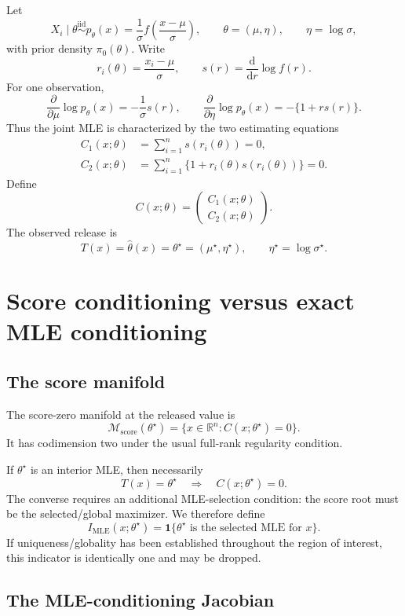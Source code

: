 \documentclass[11pt]{article}
\newcommand{\R}{\mathbb{R}}
\newcommand{\1}{\mathbf{1}}
\newcommand{\dd}{\mathrm{d}}
\newcommand{\MLE}{\mathrm{MLE}}
\begin{document}
Let
\[
    X_i\mid \theta \overset{\mathrm{iid}}{\sim}
    p_\theta(x)
    =\frac{1}{\sigma}
    f\!\left(\frac{x-\mu}{\sigma}\right),
    \qquad
    \theta=(\mu,\eta),\qquad \eta=\log\sigma,
\]
with prior density $\pi_0(\theta)$.  Write
\[
    r_i(\theta)=\frac{x_i-\mu}{\sigma},
    \qquad
    s(r)=\frac{\dd}{\dd r}\log f(r).
\]
For one observation,
\[
    \frac{\partial}{\partial \mu}\log p_\theta(x)
    =-\frac{1}{\sigma}s(r),
    \qquad
    \frac{\partial}{\partial \eta}\log p_\theta(x)
    =-\{1+r s(r)\}.
\]
Thus the joint MLE is characterized by the two estimating equations
\begin{align}
    C_1(x;\theta)
    &=\sum_{i=1}^n s(r_i(\theta))=0, \\
    C_2(x;\theta)
    &=\sum_{i=1}^n \{1+r_i(\theta)s(r_i(\theta))\}=0.
\end{align}
Define
\[
    C(x;\theta)
    =
    \begin{pmatrix}
    C_1(x;\theta)\\
    C_2(x;\theta)
    \end{pmatrix}.
\]
The observed release is
\[
    T(x)=\widehat\theta(x)=\theta^\star
    =(\mu^\star,\eta^\star),
    \qquad \eta^\star=\log\sigma^\star.
\]

\section{Score conditioning versus exact MLE conditioning}

\subsection{The score manifold}

The score-zero manifold at the released value is
\[
    \mathcal M_{\mathrm{score}}(\theta^\star)
    =\{x\in\R^n:C(x;\theta^\star)=0\}.
\]
It has codimension two under the usual full-rank regularity condition.

If $\theta^\star$ is an interior MLE, then necessarily
\[
    T(x)=\theta^\star
    \quad\Longrightarrow\quad
    C(x;\theta^\star)=0.
\]
The converse requires an additional MLE-selection condition: the score root must be the selected/global maximizer.  We therefore define
\[
    I_{\MLE}(x;\theta^\star)
    =\1\{\theta^\star\text{ is the selected MLE for }x\}.
\]
If uniqueness/globality has been established throughout the region of interest, this indicator is identically one and may be dropped.

\subsection{The MLE-conditioning Jacobian}
\end{document}

